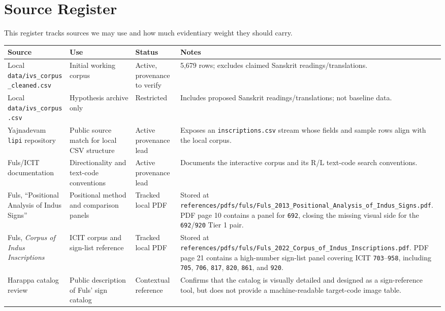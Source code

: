 \section{Source Register}

This register tracks sources we may use and how much evidentiary weight they should carry.

\begin{longtable}{p{}p{}p{}p{}}
\toprule
\textbf{Source} & \textbf{Use} & \textbf{Status} & \textbf{Notes} \\
\midrule
\endhead
Local \texttt{data/ivs\_corpus\_cleaned.csv} & Initial working corpus & Active, provenance to verify & 5,679 rows; excludes claimed Sanskrit readings/translations. \\
Local \texttt{data/ivs\_corpus.csv} & Hypothesis archive only & Restricted & Includes proposed Sanskrit readings/translations; not baseline data. \\
Yajnadevam \texttt{lipi} repository \citep{yajnadevamLipi} & Public source match for local CSV structure & Active provenance lead & Exposes an \texttt{inscriptions.csv} stream whose fields and sample rows align with the local corpus. \\
Fuls/ICIT documentation \citep{fulsICIT} & Directionality and text-code conventions & Active provenance lead & Documents the interactive corpus and its R/L text-code search conventions. \\
Fuls, ``Positional Analysis of Indus Signs'' \citep{fuls2013positional} & Positional method and comparison panels & Tracked local PDF & Stored at \texttt{references/pdfs/fuls/Fuls\_2013\_Positional\_Analysis\_of\_Indus\_Signs.pdf}. PDF page 10 contains a panel for \texttt{692}, closing the missing visual side for the \texttt{692}/\texttt{920} Tier 1 pair. \\
Fuls, \emph{Corpus of Indus Inscriptions} \citep{fuls2022corpus} & ICIT corpus and sign-list reference & Tracked local PDF & Stored at \texttt{references/pdfs/fuls/Fuls\_2022\_Corpus\_of\_Indus\_Inscriptions.pdf}. PDF page 21 contains a high-number sign-list panel covering ICIT \texttt{703}--\texttt{958}, including \texttt{705}, \texttt{706}, \texttt{817}, \texttt{820}, \texttt{861}, and \texttt{920}. \\
Harappa catalog review \citep{harappaCatalog2026} & Public description of Fuls' sign catalog & Contextual reference & Confirms that the catalog is visually detailed and designed as a sign-reference tool, but does not provide a machine-readable target-code image table. \\

\end{longtable}
